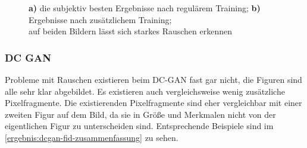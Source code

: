 \begin{figure}[H]
	\centering
	\qquad
	\label{ergebnis:densegan-zusammenfassung}
	\caption[]{\textbf{a)} die subjektiv besten Ergebnisse nach regulärem Training; \textbf{b)} Ergebnisse nach zusätzlichem Training; \\auf beiden Bildern lässt sich starkes Rauschen erkennen}
\end{figure}

\subsubsection{DC GAN}
Probleme mit Rauschen existieren beim DC-GAN fast gar nicht, die Figuren sind alle sehr klar abgebildet.
Es existieren auch vergleichsweise wenig zusätzliche Pixelfragmente.
Die existierenden Pixelfragmente sind eher vergleichbar mit einer zweiten Figur auf dem Bild, da sie in Größe und Merkmalen nicht von der eigentlichen Figur zu unterscheiden sind.
Entsprechende Beispiele sind im \cref{ergebnis:dcgan-fid-zusammenfassung} zu sehen.
\newline

